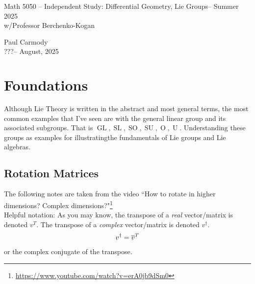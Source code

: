 \documentclass[12pt,a4paper]{report}
\newcommand{\CLASSNAME}{Math 5050 -- Independent Study: Differential Geometry, Lie Groups}
\newcommand{\STUDENTNAME}{Paul Carmody}
\newcommand{\ASSIGNMENT}{???}
\newcommand{\DUEDATE}{August, 2025}
\newcommand{\PROFESSOR}{Professor Berchenko-Kogan}
\newcommand{\SEMESTER}{Summer 2025}
\newcommand{\GLG}{\operatorname{GL}}
\newcommand{\SLG}{\operatorname{SL}}
\newcommand{\SOG}{\operatorname{SO}}
\newcommand{\SUG}{\operatorname{SU}}
\newcommand{\OG}{\operatorname{O}}
\newcommand{\UG}{\operatorname{U}}
\begin{document}
\begin{center}
	\Large{\CLASSNAME -- \SEMESTER} \\
	\large{ w/\PROFESSOR}
\end{center}
\begin{center}
	\STUDENTNAME \\
	\ASSIGNMENT -- \DUEDATE\\
\end{center} 

\chapter{Foundations}

Although Lie Theory is written in the abstract and most general terms, the most common examples that I've seen are with the general linear group and its associated subgroups.  That is $\GLG, \SLG, \SOG, \SUG, \OG, \UG$.  Understanding these groups as examples for illustratingthe fundamentals of Lie groups and Lie algebras.\\

\section{Rotation Matrices}

The following notes are taken from the video ``How to rotate in higher dimensions? Complex dimensions?"\footnote{\url{https://www.youtube.com/watch?v=erA0jb9dSm0}}\\

Helpful notation: As you may know, the transpose of a \textit{real} vector/matrix is denoted $v^T$.  The transpose of a \textit{complex} vector/matrix is denoted $v^\dagger$.
\begin{align*}
	v^\dagger = \overline{v}^T
\end{align*}or the complex conjugate of the transpose.
\end{document}
